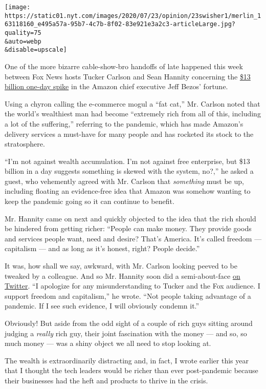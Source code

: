 \texttt{[image: https://static01.nyt.com/images/2020/07/23/opinion/23swisher1/merlin\_163118160\_e495a57a-95b7-4c7b-8f02-83e921e3a2c3-articleLarge.jpg?quality=75\\\&auto=webp\\\&disable=upscale]}

One of the more bizarre cable-show-bro handoffs of late happened this
week between Fox News hosts Tucker Carlson and Sean Hannity concerning
the \href{https://time.com/5869262/jeff-bezos-13-billion/}{\$13 billion
one-day spike} in the Amazon chief executive Jeff Bezos' fortune.

Using a chyron calling the e-commerce mogul a ``fat cat,'' Mr. Carlson
noted that the world's wealthiest man had become ``extremely rich from
all of this, including a lot of the suffering,'' referring to the
pandemic, which has made Amazon's delivery services a must-have for many
people and has rocketed its stock to the stratosphere.

``I'm not against wealth accumulation. I'm not against free enterprise,
but \$13 billion in a day suggests something is skewed with the system,
no?,'' he asked a guest, who vehemently agreed with Mr. Carlson that
\emph{something} must be up, including floating an evidence-free idea
that Amazon was somehow wanting to keep the pandemic going so it can
continue to benefit.

Mr. Hannity came on next and quickly objected to the idea that the rich
should be hindered from getting richer: ``People can make money. They
provide goods and services people want, need and desire? That's America.
It's called freedom --- capitalism --- and as long as it's honest,
right? People decide.''

It was, how shall we say, awkward, with Mr. Carlson looking peeved to be
tweaked by a colleague. And so Mr. Hannity soon did a semi-about-face
\href{https://twitter.com/seanhannity/status/1285761201344057344}{on
Twitter}. ``I apologize for any misunderstanding to Tucker and the Fox
audience. I support freedom and capitalism,'' he wrote. ``Not people
taking advantage of a pandemic. If I see such evidence, I will obviously
condemn it.''

Obviously! But aside from the odd sight of a couple of rich guys sitting
around judging a \emph{really} rich guy, their joint fascination with
the money --- and so, so much money --- was a shiny object we all need
to stop looking at.

The wealth is extraordinarily distracting and, in fact, I wrote earlier
this year that I thought the tech leaders would be richer than ever
post-pandemic because their businesses had the heft and products to
thrive in the crisis.

